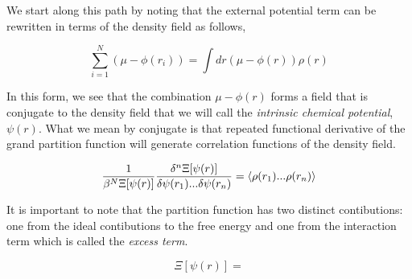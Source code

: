 We start along this path by noting that the external potential term can be rewritten in terms of the density field as follows, 

\begin{equation}
    \sum_{i=1}^N (\mu - \phi(r_i)) = \int dr (\mu - \phi(r))\rho(r)
\end{equation}

In this form, we see that the combination $\mu - \phi(r)$ forms a field that is conjugate to the density field that we will call the \textit{intrinsic chemical potential}, $\psi(r)$. What we mean by conjugate is that repeated functional derivative of the grand partition function will generate correlation functions of the density field. 

\begin{equation}
\frac{1}{\beta^N \Xi[\psi(r)]}\frac{\delta^n \Xi[\psi(r)]}{\delta \psi(r_1) ... \delta \psi(r_n)} = \left\langle \rho(r_1) ...\rho(r_n) \right\rangle
\end{equation}

It is important to note that the partition function has two distinct contibutions: one from the ideal contibutions to the free energy and one from the interaction term which is called the \textit{excess term}. 

\begin{equation}
    \Xi[\psi(r)] = 
\end{equation}